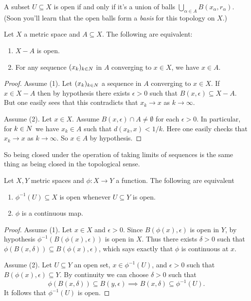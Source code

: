 \begin{exercise}
  \label{unionofballs}
  A subset $U \subseteq X$ is open if and only if it's a union of
  balls $\bigcup_{\alpha \in A} B(x_\alpha, r_\alpha)$. (Soon you'll
  learn that the open balls form a \textit{basis} for this topology on
  $X$.)
\end{exercise}

\begin{proposition}
  Let $X$ a metric space and $A \subseteq X$. The following are
  equivalent:
  \begin{enumerate}
  \item $X - A$ is open.
  \item For any sequence $(x_k)_{k \in N}$ in $A$ converging to $x
    \in X$, we have $x \in A$.
  \end{enumerate}
\end{proposition}

\begin{proof}
  Assume (1). Let $(x_k)_{k \in N}$ a sequence in $A$ converging to
  $x \in X$. If $x \in X - A$ then by hypothesis there exists
  $\epsilon > 0$ such that $B(x, \epsilon) \subseteq X - A$. But one
  easily sees that this contradicts that $x_k \to x$ as $k \to
  \infty$.

  Assume (2). Let $x \in X$. Assume $B(x,\epsilon) \cap A \ne
  \emptyset$ for each $\epsilon > 0$. In particular, for $k \in N$ we
  have $x_k \in A$ such that $d(x_k,x) < 1/k$. Here one easily checks
  that $x_k \to x$ as $k \to \infty$. So $x \in A$ by hypothesis.
\end{proof}

So being closed under the operation of taking limits of sequences is
the same thing as being closed in the topological sense.

\begin{proposition}
  Let $X, Y$ metric spaces and $\phi : X \to Y$ a function. The
  following are equivalent
  \begin{enumerate}
  \item $\phi^{-1}(U) \subseteq X$ is open whenever $U \subseteq Y$ is
    open.
  \item $\phi$ is a continuous map.
  \end{enumerate}
\end{proposition}

\begin{proof}
  Assume (1). Let $x \in X$ and $\epsilon > 0$. Since
  $B(\phi(x),\epsilon)$ is open in $Y$, by hypothesis
  $\phi^{-1}(B(\phi(x), \epsilon))$ is open in $X$. Thus there exists
  $\delta > 0$ such that $\phi(B(x, \delta)) \subseteq B(\phi(x),
  \epsilon)$, which says exactly that $\phi$ is continuous at $x$.

  Assume (2). Let $U \subseteq Y$ an open set, $x \in \phi^{-1}(U)$,
  and $\epsilon > 0$ such that $B(\phi(x),\epsilon) \subseteq Y$. By
  continuity we can choose $\delta > 0$ such that
  \[
  \phi(B(x,\delta)) \subseteq B(y,\epsilon) \implies B(x,\delta)
  \subseteq \phi^{-1}(U).
  \]
  It follows that $\phi^{-1}(U)$ is open.
\end{proof}

